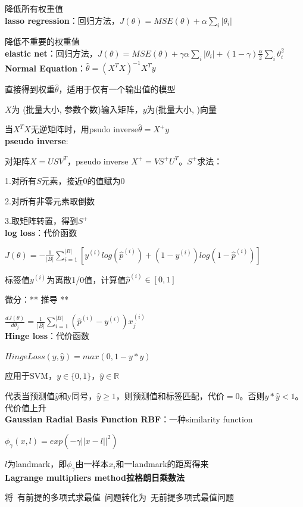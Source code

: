 \documentclass[UTF8]{ctexart}
\begin{document}
  降低所有权重值\\
\textbf{lasso regression}：回归方法，$J(\theta) = MSE(\theta) + \alpha \sum_i |\theta_i|$

  降低不重要的权重值\\
\textbf{elastic net}：回归方法，$J(\theta) = MSE(\theta) + \gamma\alpha \sum_i |\theta_i| + (1-\gamma)\frac{\alpha}{2}\sum_{i}\theta_i^2$\\
\textbf{Normal Equation}：$\hat{\theta} = (X^TX)^{-1}X^Ty$

  直接得到权重$\hat{\theta}$，适用于仅有一个输出值的模型

  $X$为 (批量大小, 参数个数)输入矩阵，$y$为(批量大小, )向量
  
  当$X^TX$无逆矩阵时，用psudo inverse$\hat{\theta} = X^+y$\\
\textbf{pseudo inverse}:

  对矩阵$X=USV^T$，pseudo inverse $X^+=VS^+U^T$。$S^+$求法：

  \quad 1.对所有$S$元素，接近0的值赋为0

  \quad 2.对所有非零元素取倒数

  \quad 3.取矩阵转置，得到$S^+$\\
\textbf{log loss}：代价函数

  $J(\theta) = -\frac{1}{|B|}\sum_{i=1}^{|B|}[y^{(i)}log(\hat{p}^{(i)}) + (1-y^{(i)})log(1-\hat{p}^{(i)})]$

  标签值$y^{(i)}$为离散1/0值，计算值$\hat{p}^{(i)} \in [0,1]$

  微分：** 推导 **
  
  \quad $\frac{d J(\theta)}{d \theta_j} = \frac{1}{|B|}\sum_{i=1}^{|B|}(\hat{p}^{(i)} - y^{(i)}) x_j^{(i)}$\\
\textbf{Hinge loss}：代价函数

  $HingeLoss(y, \hat{y}) = max(0, 1-y*\hat{y})$

  应用于SVM，$y \in \{0, 1\}$，$\hat{y} \in \mathbb{R} $
  
  代表当预测值$\hat{y}$和y同号，$\hat{y} \geq 1$，则预测值和标签匹配，代价$=0$。否则$y*\hat{y} < 1$。代价值上升\\
\textbf{Gaussian Radial Basis Function RBF}：一种similarity function

  $\phi_{\gamma}(x, l) = exp(-\gamma||x-l||^2)$

  \quad $l$为landmark，即$\phi_{\gamma}$由一样本$x_i$和一landmark的距离得来\\
\textbf{Lagrange multipliers method拉格朗日乘数法}

  将\ 有前提的多项式求最值\ 问题转化为\ 无前提多项式最值问题
\end{document}
